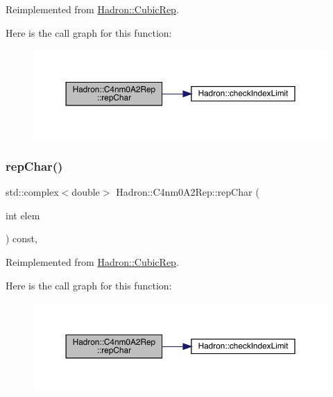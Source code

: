 Reimplemented from \mbox{\hyperlink{structHadron_1_1CubicRep_af45227106e8e715e84b0af69cd3b36f8}{Hadron\+::\+Cubic\+Rep}}.

Here is the call graph for this function\+:
\nopagebreak
\begin{figure}[H]
\begin{center}
\leavevmode
\includegraphics[width=350pt]{d2/db9/structHadron_1_1C4nm0A2Rep_ad4d1ed2c8ee991654f7c1369f487a810_cgraph}
\end{center}
\end{figure}
\mbox{\label{structHadron_1_1C4nm0A2Rep_ad4d1ed2c8ee991654f7c1369f487a810}} 
\subsubsection{\texorpdfstring{repChar()}{repChar()}\hspace{0.1cm}{\footnotesize\ttfamily [2/2]}}
{\footnotesize\ttfamily std\+::complex$<$double$>$ Hadron\+::\+C4nm0\+A2\+Rep\+::rep\+Char (\begin{DoxyParamCaption}\item[{int}]{elem }\end{DoxyParamCaption}) const\hspace{0.3cm}{\ttfamily [inline]}, {\ttfamily [virtual]}}



Reimplemented from \mbox{\hyperlink{structHadron_1_1CubicRep_af45227106e8e715e84b0af69cd3b36f8}{Hadron\+::\+Cubic\+Rep}}.

Here is the call graph for this function\+:
\nopagebreak
\begin{figure}[H]
\begin{center}
\leavevmode
\includegraphics[width=350pt]{d2/db9/structHadron_1_1C4nm0A2Rep_ad4d1ed2c8ee991654f7c1369f487a810_cgraph}
\end{center}
\end{figure}
\mbox{\label{structHadron_1_1C4nm0A2Rep_aac52fe57a274d94bbaef9c6b2699e1c9}} 
